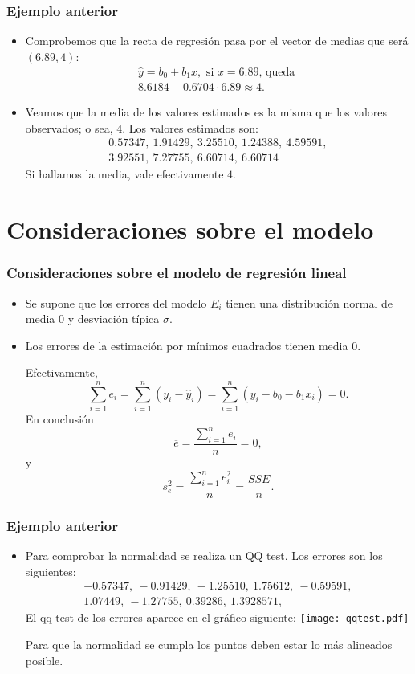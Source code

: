 \begin{frame}
\frametitle{Ejemplo anterior}
\begin{itemize}
\item<2->{Comprobemos que la recta de regresión pasa por el vector de medias que será $(6.89,4)$:
$$
\begin{array}{l}
\hat{y}=b_0 + b_1 x,\mbox{ si $x=6.89$, queda }\\
8.6184-0.6704\cdot 6.89\approx 4.
\end{array}
$$}
\item<3->{Veamos que la media de los valores estimados es la misma que los valores observados; o sea, $4$. Los valores estimados son:
$$
\begin{array}{l}
0.57347,\ 1.91429,\  3.25510,\  1.24388,\  4.59591,\\
3.92551,\  7.27755,\  6.60714,\  6.60714
\end{array}
$$
Si hallamos la media, vale efectivamente $4$.}
\end{itemize}
\end{frame}

\section{Consideraciones sobre el modelo}
\begin{frame}
\frametitle{Consideraciones sobre el modelo de regresión lineal}

\begin{itemize}
\item<2->{Se  supone que los errores del modelo $E_i$ tienen una
distribución normal de media 0 y desviación típica $\sigma$.}

\item<3->{Los errores  de la estimación por mínimos
cuadrados tienen media $0$.

Efectivamente,
 $$\sum_{i=1}^n e_i=\sum_{i=1}^n
(y_i-\hat{y}_i)=\sum_{i=1}^n (y_i-b_0-b_1 x_i)=0.$$
En conclusión
$$\overline{e}=\frac{\sum_{i=1}^n e_i}{n}=0,$$
y
$$s_e^2=\frac{\sum_{i=1}^{n}
e^2_i}{n}=\frac{SSE}{n}.$$}
\end{itemize}
\end{frame}

\begin{frame}
\frametitle{Ejemplo anterior}
\begin{itemize}
\item<2->{Para comprobar la normalidad se realiza un QQ test. Los errores son los siguientes:
$$
\begin{array}{l}
-0.57347,\  -0.91429,\  -1.25510,\   1.75612,\  -0.59591,
\\  1.07449,\  -1.27755,\ 0.39286,\   1.3928571,
\end{array}
$$
El qq-test de los errores aparece en el gráfico siguiente:
\texttt{[image: qqtest.pdf]}

Para que la normalidad se cumpla los puntos deben estar lo más alineados posible.}
\end{itemize}
\end{frame}
